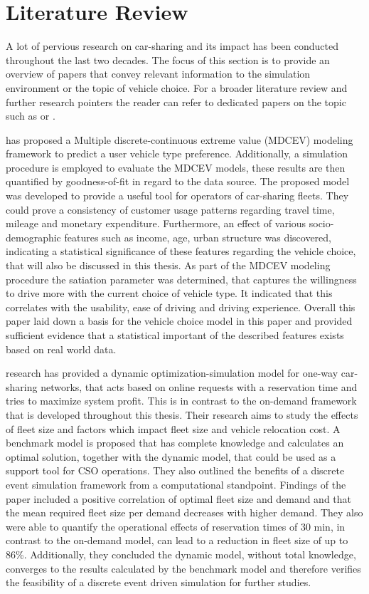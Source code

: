 \clearpage
\section{Literature Review}
\label{sec:lr}

A lot of pervious research on car-sharing and its impact has been conducted throughout
the last two decades. The focus of this section is to provide an overview of papers 
that convey relevant information to the simulation environment or the topic of vehicle
choice. For a broader literature review and further research pointers the reader can 
refer to dedicated papers on the topic such as  or .

 has proposed a Multiple discrete-continuous extreme value (MDCEV) modeling framework to predict 
a user vehicle type preference. Additionally, a simulation procedure is employed to evaluate the MDCEV
models, these results are then quantified by goodness-of-fit in regard to the data source.
The proposed model was developed to provide a useful tool for operators of car-sharing fleets.
They could prove a consistency of customer usage patterns regarding travel time, mileage and
monetary expenditure. Furthermore, an effect of various socio-demographic features such
as income, age, urban structure was discovered, indicating a statistical significance of these features
regarding the vehicle choice, that will also be discussed in this thesis.
As part of the MDCEV modeling procedure the satiation parameter was determined, that captures
the willingness to drive more with the current choice of vehicle type. It indicated that this
correlates with the usability, ease of driving and driving experience. Overall this paper
laid down a basis for the vehicle choice model in this paper and provided sufficient evidence that
a statistical important of the described features exists based on real world data.

 research has provided a dynamic optimization-simulation model for 
one-way car-sharing networks, that acts based on
online requests with a reservation time and tries to maximize system profit. This is in contrast to the on-demand
framework that is developed throughout this thesis. Their research aims to study the effects
of fleet size and factors which impact fleet size and vehicle relocation cost. A benchmark
model is proposed that has complete knowledge and calculates an optimal solution, together with
the dynamic model, that could be used as a support tool for CSO operations. They also outlined
the benefits of a discrete event simulation framework from a computational standpoint. Findings
of the paper included a positive correlation of optimal fleet size and demand and that
the mean required fleet size per demand decreases with higher demand. They also were able to
quantify the operational effects of reservation times of 30 min, in contrast to the on-demand
model, can lead to a reduction in fleet size of up to 86\%. Additionally, they
concluded the dynamic model, without total knowledge, converges to the results calculated
by the benchmark model and therefore verifies the feasibility of a discrete event driven
simulation for further studies. 

